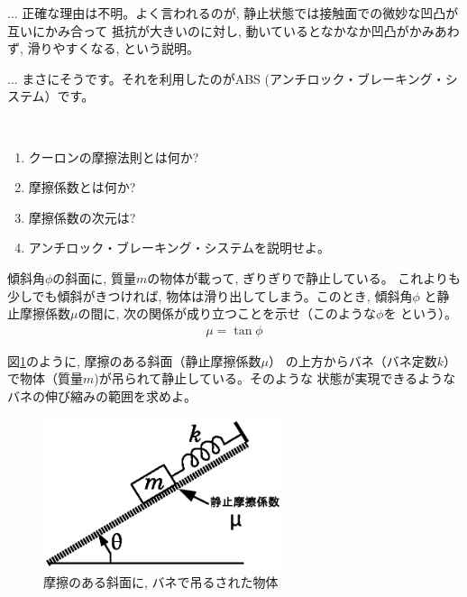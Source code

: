 \begin{faq}{\small{}
... 正確な理由は不明。よく言われるのが, 静止状態では接触面での微妙な凹凸が互いにかみ合って
抵抗が大きいのに対し, 動いているとなかなか凹凸がかみあわず, 滑りやすくなる, という説明。}\end{faq}\mv

\begin{faq}{\small{}
... まさにそうです。それを利用したのがABS (アンチロック・ブレーキング・システム）です。}\end{faq}\mv


\begin{q}\label{q:friction}　
\begin{enumerate}
\item クーロンの摩擦法則とは何か?
\item 摩擦係数とは何か?
\item 摩擦係数の次元は?
\item アンチロック・ブレーキング・システムを説明せよ。
\end{enumerate}
\end{q}
\mv

\begin{q}\label{q:friction_slope}
傾斜角$\phi$の斜面に, 質量$m$の物体が載って, ぎりぎりで静止している。
これよりも少しでも傾斜がきつければ, 物体は滑り出してしまう。このとき, 傾斜角$\phi$
と静止摩擦係数$\mu$の間に, 次の関係が成り立つことを示せ（このような$\phi$を
という）。
\begin{eqnarray}
\mu=\tan \phi
\end{eqnarray}
\end{q}
\mv

\begin{q}\label{q:slope_spring_friction}
図\ref{fig:slope_spring_friction}のように, 摩擦のある斜面（静止摩擦係数$\mu$）
の上方からバネ（バネ定数$k$）で物体（質量$m$)が吊られて静止している。そのような
状態が実現できるようなバネの伸び縮みの範囲を求めよ。
\begin{figure}[h]
    \centering
    \includegraphics[width=7cm]{slope_spring_friction.eps}
    \caption{摩擦のある斜面に, バネで吊るされた物体}\label{fig:slope_spring_friction}
\end{figure}
\end{q}
\hv


